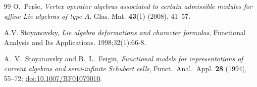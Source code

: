 \documentclass[11pt]{amsart}
\theoremstyle{definition}
\theoremstyle{remark}
\begin{document}
\begin{thebibliography}{99}
O.~Per\v{s}e,
\emph{Vertex operator algebras associated to certain admissible modules
	for affine Lie algebras of type $A$},
Glas. Mat. \textbf{43}(1) (2008), 41--57.

 A.V. Stoyanovsky, \emph{Lie algebra deformations and character formulas}, Functional Analysis and Its Applications. 1998;32(1):66-8.

A.~V.~Stoyanovsky and B.~L.~Feigin,
\emph{Functional models for representations of current algebras and
	semi-infinite Schubert cells},
Funct.~Anal.~Appl. \textbf{28} (1994), 55--72;
\href{https://doi.org/10.1007/BF01079010}{doi:10.1007/BF01079010}.































\end{thebibliography}
\end{document}
